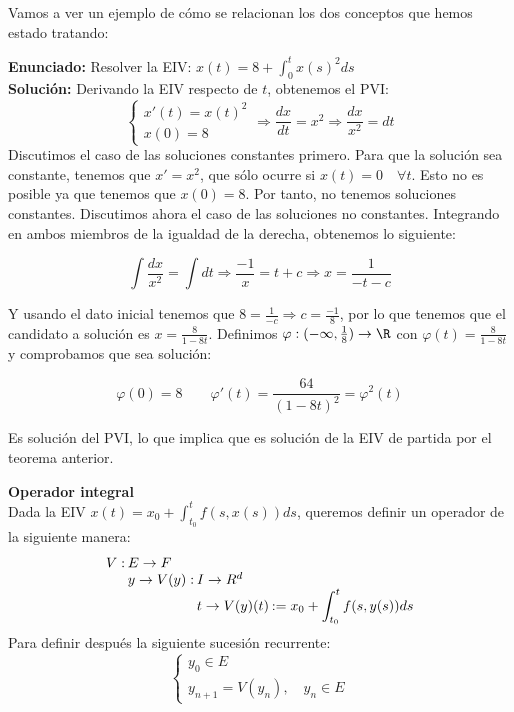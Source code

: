 \documentclass{article}
\begin{document}
  Vamos a ver un ejemplo de cómo se relacionan los dos conceptos que hemos estado tratando:

\begin{ex}
  \textbf{Enunciado:} Resolver la EIV: $x(t) = 8 + \displaystyle\int_0^t x(s)^2 ds$\\

  \textbf{Solución:} Derivando la EIV respecto de $t$, obtenemos el PVI:
  \[
    \left\{
      \begin{array}{l}
        x'(t) = x(t)^2 \\
        x(0) = 8
      \end{array}
    \right. \Rightarrow \frac{dx}{dt} = x^2 \Rightarrow \frac{dx}{x^2} = dt
  \]
  Discutimos el caso de las soluciones constantes primero. Para que la solución sea constante,
  tenemos que $x' = x^2$, que sólo ocurre si $x(t) = 0 \quad \forall t$.  Esto no es posible ya que
  tenemos que $x(0) = 8$. Por tanto, no tenemos soluciones constantes. Discutimos ahora el caso de
  las soluciones no constantes. Integrando en ambos miembros de la igualdad de la derecha, obtenemos
  lo siguiente:

    $$ \int \frac{dx}{x^2} = \int dt \Rightarrow \frac{-1}{x} = t + c \Rightarrow
    x = \frac{1}{-t-c} $$

    Y usando el dato inicial tenemos que $ 8 = \frac{1}{-c} \Rightarrow c = \frac{-1}{8}$, por lo
    que tenemos que el candidato a solución es $x = \frac{8}{1-8t}$. Definimos
    $\varphi: (-\infty, \frac{1}{8}) \to \R$ con $\varphi(t) = \frac{8}{1-8t}$ y comprobamos que sea
    solución:

    $$ \varphi(0) = 8 \quad \quad \varphi'(t) = \frac{64}{(1-8t)^2} = \varphi^2(t) $$

    Es solución del PVI, lo que implica que es solución de la EIV de partida por el teorema
    anterior.
  \end{ex}

  \textbf{Operador integral}\\

  Dada la EIV $ x(t) = x_0 + \displaystyle\int_{t_0}^t f(s, x(s)) ds $, queremos definir un operador
  de la siguiente manera:
  \[\arraycolsep=1pt\def\arraystretch{1}
    \begin{array}{llll}
      V: & E \to F     &           & \\
         & y \to V(y): & I \to R^d & \\
         &             & t \to V(y)(t) & := x_0 + \displaystyle\int_{t_0}^t f(s,y(s))ds
    \end{array}
  \]
  Para definir después la siguiente sucesión recurrente:
  \[
    \left\{
      \begin{array}{l}
        y_0 \in E \\
        y_{n+1} = V(y_n), \quad y_n \in E
      \end{array}
    \right.
  \]
\end{document}
